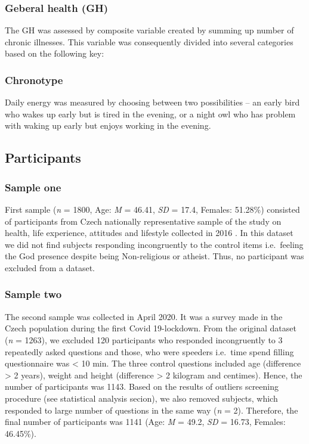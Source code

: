 \documentclass[ijerph,article,accept,moreauthors,pdftex]{mdpi}
\begin{document}
\hypertarget{geberal-health-gh}{%
\subsubsection{Geberal health (GH)}\label{geberal-health-gh}}

The GH was assessed by composite variable created by summing up number
of chronic illnesses. This variable was consequently divided into
several categories based on the following key:

\hypertarget{chronotype}{%
\subsubsection{Chronotype}\label{chronotype}}

Daily energy was measured by choosing between two possibilities -- an
early bird who wakes up early but is tired in the evening, or a night
owl who has problem with waking up early but enjoys working in the
evening.

\hypertarget{participants}{%
\subsection{Participants}\label{participants}}

\hypertarget{sample-one}{%
\subsubsection{Sample one}\label{sample-one}}

First sample (\emph{n} = 1800, Age: \emph{M} = 46.41, \emph{SD} = 17.4,
Females: 51.28\%) consisted of participants from Czech nationally
representative sample of the study on health, life experience, attitudes
and lifestyle collected in 2016 \citep{malinakova2020religiosity}. In
this dataset we did not find subjects responding incongruently to the
control items i.e.~feeling the God presence despite being Non-religious
or atheist. Thus, no participant was excluded from a dataset.

\hypertarget{sample-two}{%
\subsubsection{Sample two}\label{sample-two}}

The second sample was collected in April 2020. It was a survey made in
the Czech population during the first Covid 19-lockdown. From the
original dataset (\emph{n} = 1263), we excluded 120 participants who
responded incongruently to 3 repeatedly asked questions and those, who
were speeders i.e.~time spend filling questionnaire was \textless{} 10
min. The three control questions included age (difference \textgreater{}
2 years), weight and height (difference \textgreater{} 2 kilogram and
centimes). Hence, the number of participants was 1143. Based on the
results of outliers screening procedure (see statistical analysis
secion), we also removed subjects, which responded to large number of
questions in the same way (\emph{n} = 2). Therefore, the final number of
participants was 1141 (Age: \emph{M} = 49.2, \emph{SD} = 16.73, Females:
46.45\%).
\end{document}

